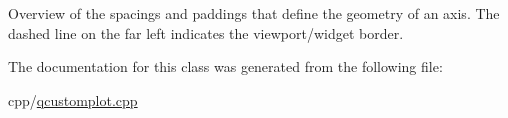  \begin{center}Overview of the spacings and paddings that define the geometry of an axis. The dashed line on the far left indicates the viewport/widget border.\end{center}  

The documentation for this class was generated from the following file\+:\begin{DoxyCompactItemize}
\item 
cpp/\mbox{\hyperlink{qcustomplot_8cpp}{qcustomplot.\+cpp}}\end{DoxyCompactItemize}
